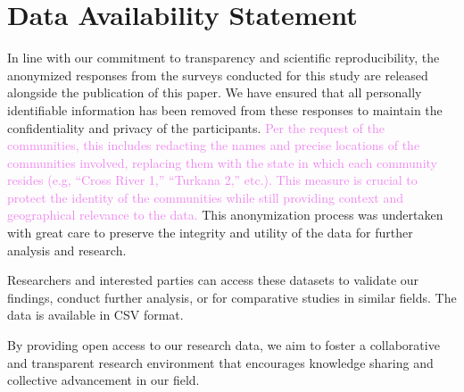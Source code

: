 \section*{Data Availability Statement}
In line with our commitment to transparency and scientific reproducibility, the anonymized responses from the surveys conducted for this study are released alongside the publication of this paper. We have ensured that all personally identifiable information has been removed from these responses to maintain the confidentiality and privacy of the participants. \textcolor{violet}{Per the request of the communities, this includes redacting the names and precise locations of the communities involved, replacing them with the state in which each community resides (e.g, ``Cross River 1,'' ``Turkana 2,'' etc.). This measure is crucial to protect the identity of the communities while still providing context and geographical relevance to the data.} This anonymization process was undertaken with great care to preserve the integrity and utility of the data for further analysis and research.

Researchers and interested parties can access these datasets to validate our findings, conduct further analysis, or for comparative studies in similar fields. The data is available in CSV format.

By providing open access to our research data, we aim to foster a collaborative and transparent research environment that encourages knowledge sharing and collective advancement in our field.